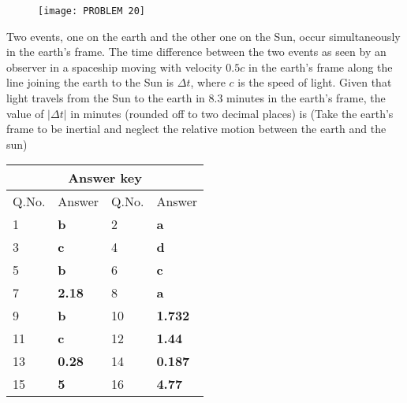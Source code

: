 \begin{enumerate}
\begin{minipage}{\textwidth}
\begin{minipage}{0.5\textwidth}
		\begin{figure}[H]
			\centering
			\texttt{[image: PROBLEM 20]}
		\end{figure}
	\end{minipage}
\end{minipage}
\begin{minipage}{\textwidth}
	\item Two events, one on the earth and the other one on the Sun, occur simultaneously in the earth's frame. The time difference between the two events as seen by an observer in a spaceship moving with velocity $0.5 c$ in the earth's frame along the line joining the earth to the Sun is $\Delta t$, where $c$ is the speed of light. Given that light travels from the Sun to the earth in $8.3$ minutes in the earth's frame, the value of $|\Delta t|$ in minutes (rounded off to two decimal places) is
	(Take the earth's frame to be inertial and neglect the relative motion between the earth and the sun)
\end{minipage}
\end{enumerate}
\setlength\arrayrulewidth{1pt}
\begin{table}[H]
	\centering
	
	\begin{tabular}{|p{1.5cm}|p{1.5cm}||p{1.5cm}|p{1.5cm}|}
		\hline
		\multicolumn{4}{|c|}{\textbf{Answer key}}\\\hline\hline
		\rowcolor{ocrel}Q.No.&Answer&Q.No.&Answer\\\hline
		1&\textbf{b}&2&\textbf{a}\\\hline
		3&\textbf{c}&4&\textbf{d}\\\hline
		5&\textbf{b}&6&\textbf{c}\\\hline
		7&\textbf{2.18}&8&\textbf{a}\\\hline
		9&\textbf{b}&10&\textbf{1.732}\\\hline
		11&\textbf{c}&12&\textbf{1.44}\\\hline
		13&\textbf{0.28}&14&\textbf{0.187}\\\hline
		15&\textbf{5}&16&\textbf{4.77}\\\hline
	\end{tabular}
\end{table}

 



























